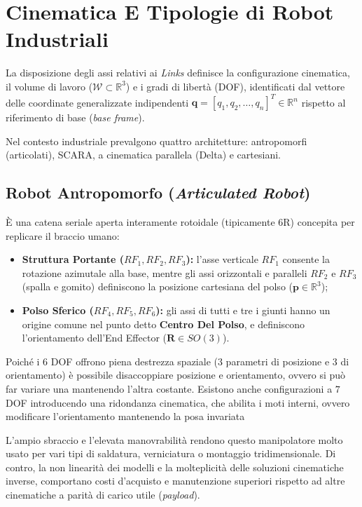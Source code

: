 ﻿\documentclass[11pt, a4paper]{article}
\begin{document}
\section{Cinematica E Tipologie di Robot Industriali}
La disposizione degli assi relativi ai \textit{Links}  definisce la configurazione cinematica, il volume di lavoro ($\mathcal{W} \subset \mathbb{R}^3$) e i gradi di libertà (DOF), identificati dal vettore delle coordinate generalizzate indipendenti $\boldsymbol{q} = [q_1, q_2, \dots, q_n]^T \in \mathbb{R}^n$ rispetto al riferimento di base (\textit{base frame}).

Nel contesto industriale prevalgono quattro architetture: antropomorfi (articolati), SCARA, a cinematica parallela (Delta) e cartesiani.

\subsection{Robot Antropomorfo (\textit{Articulated Robot})}
È una catena seriale aperta interamente rotoidale (tipicamente $6\text{R}$) concepita per replicare il braccio umano:
\begin{itemize}
    \item \textbf{Struttura Portante ($RF_1, RF_2, RF_3$):} l'asse verticale $RF_1$ consente la rotazione azimutale alla base, mentre gli assi orizzontali e paralleli $RF_2$ e $RF_3$ (spalla e gomito) definiscono la posizione cartesiana del polso ($\boldsymbol{p} \in \mathbb{R}^3$);
    \item \textbf{Polso Sferico ($RF_4, RF_5, RF_6$):} gli assi di tutti e tre i giunti hanno un origine comune nel punto detto \textbf{Centro Del Polso}, e definiscono l'orientamento dell'End Effector ($\boldsymbol{R} \in SO(3)$).
\end{itemize}
Poiché i $6$ DOF offrono piena destrezza spaziale ($3$ parametri di posizione e $3$ di orientamento) è possibile disaccoppiare posizione e orientamento, ovvero si può far variare una mantenendo l'altra costante. Esistono anche configurazioni a $7$ DOF introducendo una ridondanza cinematica, che abilita i moti interni, ovvero modificare l'orientamento mantenendo la posa invariata

L'ampio sbraccio e l'elevata manovrabilità rendono questo manipolatore molto usato per vari tipi di saldatura, verniciatura o montaggio tridimensionale. Di contro, la non linearità dei modelli e la molteplicità delle soluzioni cinematiche inverse, comportano costi d'acquisto e manutenzione superiori rispetto ad altre cinematiche a parità di carico utile (\textit{payload}).
\end{document}

